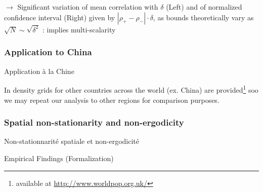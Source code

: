 $\rightarrow$ Significant variation of mean correlation with $\delta$ (Left) and of normalized confidence interval (Right) given by $\left|\rho_+ - \rho_-\right|\cdot \delta$, as bounds theoretically vary as $\sqrt{N} \sim \sqrt{\delta^2}$ : implies multi-scalarity








\subsubsection{Application to China}{Application à la Chine}






In \cite{10.1371/journal.pone.0107042} density grids for other countries across the world (ex. China) are provided\footnote{available at \url{http://www.worldpop.org.uk/}} soo we may repeat our analysis to other regions for comparison purposes. 









\subsubsection{Spatial non-stationarity and non-ergodicity}{Non-stationnarité spatiale et non-ergodicité}
















Empirical Findings (Formalization)


